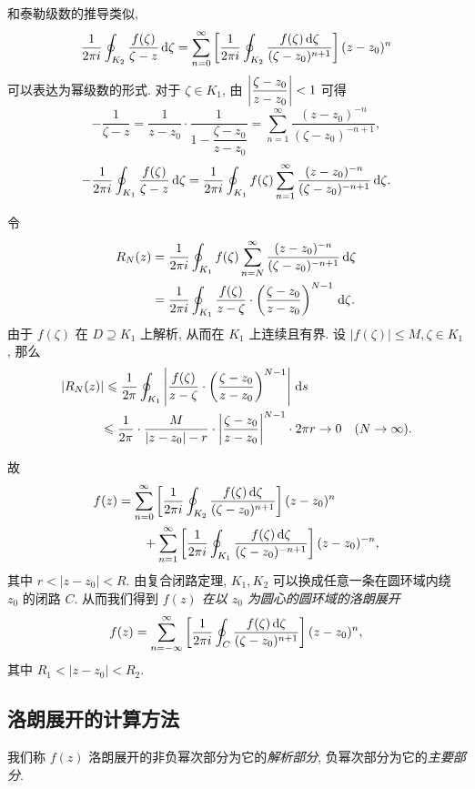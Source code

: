 和泰勒级数的推导类似,
	\[\frac1{2\pi i}\oint_{K_2}\frac{f(\zeta)}{\zeta-z}\,\mathrm{d}\zeta
	=\sum_{n=0}^\infty\left[\frac1{2\pi i}\oint_{K_2}\frac{f(\zeta)\,\mathrm{d}\zeta}{(\zeta-z_0)^{n+1}}\right](z-z_0)^n\]
可以表达为幂级数的形式.
对于 $\zeta\in K_1$, 由 $\left|\dfrac{\zeta-z_0}{z-z_0}\right|<1$ 可得
	\[-\frac1{\zeta-z}=\frac1{z-z_0}\cdot\frac1{1-\dfrac{\zeta-z_0}{z-z_0}}=\sum_{n=1}^\infty\frac{(z-z_0)^{-n}}{(\zeta-z_0)^{-n+1}},\]
	\[-\frac1{2\pi i}\oint_{K_1}\frac{f(\zeta)}{\zeta-z}\,\mathrm{d}\zeta=\frac1{2\pi i}\oint_{K_1}f(\zeta)\sum_{n=1}^\infty\frac{(z-z_0)^{-n}}{(\zeta-z_0)^{-n+1}}\,\mathrm{d}\zeta.\]

令
\begin{align*}
	R_N(z)&=\frac1{2\pi i}\oint_{K_1}f(\zeta)\sum_{n=N}^\infty\frac{(z-z_0)^{-n}}{(\zeta-z_0)^{-n+1}}\,\mathrm{d}\zeta\\
	&=\frac1{2\pi i}\oint_{K_1}\frac{f(\zeta)}{z-\zeta}\cdot\left(\frac{\zeta-z_0}{z-z_0}\right)^{N-1}\,\mathrm{d}\zeta.
\end{align*}
由于 $f(\zeta)$ 在 $D\supseteq K_1$ 上解析, 从而在 $K_1$ 上连续且有界.
设 $|f(\zeta)|\le M,\zeta\in K_1$,
那么
\begin{align*}
|R_N(z)|&\leqslant\frac 1{2\pi}\oint_{K_1}\left|\frac{f(\zeta)}{z-\zeta}\cdot\left(\frac{\zeta-z_0}{z-z_0}\right)^{N-1}\right|\,\mathrm{d} s\\
&{\leqslant\frac 1{2\pi}\cdot\frac M{|z-z_0|-r}\cdot\left|\frac{\zeta-z_0}{z-z_0}\right|^{N-1}\cdot 2\pi r\to 0\quad (N\to\infty).}
\end{align*}

故
\begin{align*}
f(z)&=\sum_{n=0}^\infty\left[\frac1{2\pi i}\oint_{K_2}\frac{f(\zeta)\,\mathrm{d}\zeta}{(\zeta-z_0)^{n+1}}\right](z-z_0)^n\\
&\qquad+\sum_{n=1}^\infty \left[\frac1{2\pi i}\oint_{K_1}\frac{f(\zeta)\,\mathrm{d}\zeta}{(\zeta-z_0)^{-n+1}}\right](z-z_0)^{-n},
\end{align*}
其中 $r<|z-z_0|<R$.
由复合闭路定理, $K_1,K_2$ 可以换成任意一条在圆环域内绕 $z_0$ 的闭路 $C$.
从而我们得到 \emph{$f(z)$ 在以 $z_0$ 为圆心的圆环域的洛朗展开}
	\[f(z)=\sum_{n=-\infty}^\infty\left[\frac1{2\pi i}\oint_C\frac{f(\zeta)\,\mathrm{d}\zeta}{(\zeta-z_0)^{n+1}}\right](z-z_0)^n,\]
其中 $R_1<|z-z_0|<R_2$.

\subsection{洛朗展开的计算方法}

我们称 $f(z)$ 洛朗展开的非负幂次部分为它的\emph{解析部分}, 负幂次部分为它的\emph{主要部分}.

